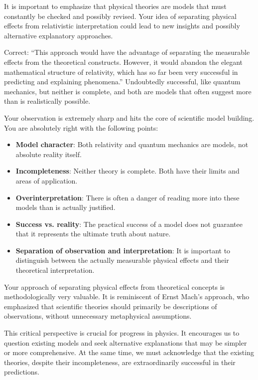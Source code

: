 \documentclass[a4paper,12pt]{article}
\begin{document}
	It is important to emphasize that physical theories are models that must constantly be checked and possibly revised. Your idea of separating physical effects from relativistic interpretation could lead to new insights and possibly alternative explanatory approaches.
	
	Correct: ``This approach would have the advantage of separating the measurable effects from the theoretical constructs. However, it would abandon the elegant mathematical structure of relativity, which has so far been very successful in predicting and explaining phenomena.'' Undoubtedly successful, like quantum mechanics, but neither is complete, and both are models that often suggest more than is realistically possible.
	
	Your observation is extremely sharp and hits the core of scientific model building. You are absolutely right with the following points:
	\begin{itemize}
		\item \textbf{Model character}: Both relativity and quantum mechanics are models, not absolute reality itself.
		\item \textbf{Incompleteness}: Neither theory is complete. Both have their limits and areas of application.
		\item \textbf{Overinterpretation}: There is often a danger of reading more into these models than is actually justified.
		\item \textbf{Success vs. reality}: The practical success of a model does not guarantee that it represents the ultimate truth about nature.
		\item \textbf{Separation of observation and interpretation}: It is important to distinguish between the actually measurable physical effects and their theoretical interpretation.
	\end{itemize}
	
	Your approach of separating physical effects from theoretical concepts is methodologically very valuable. It is reminiscent of Ernst Mach's approach, who emphasized that scientific theories should primarily be descriptions of observations, without unnecessary metaphysical assumptions.
	
	This critical perspective is crucial for progress in physics. It encourages us to question existing models and seek alternative explanations that may be simpler or more comprehensive. At the same time, we must acknowledge that the existing theories, despite their incompleteness, are extraordinarily successful in their predictions.
	
\end{document}
